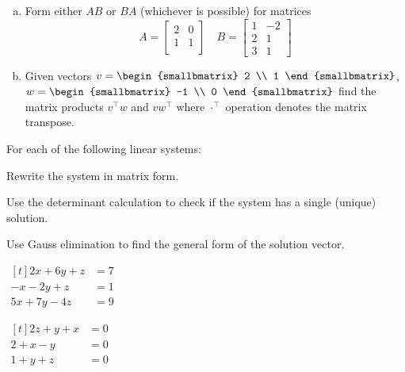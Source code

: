 \begin{question}
\begin{enumerate}[(a)]
  \item Form either \(AB\) or \(BA\) (whichever is possible) for matrices
    \begin{equation*}
      A =
      \begin{bmatrix*}
        2 & 0  \\
        1 & 1 \\
      \end{bmatrix*}
\quad
      B =
      \begin{bmatrix*}
        1 & -2 \\
        2 & 1 \\
        3 & 1
      \end{bmatrix*}
    \end{equation*}


  \item Given vectors \(v =
    \begin{smallbmatrix}
      2 \\ 1
    \end{smallbmatrix}
\), \(w =
    \begin{smallbmatrix}
      -1 \\ 0
    \end{smallbmatrix}
    \)
    find the matrix products \(v^\top w\) and \(v w^\top\) where \(\cdot^{\top}\) operation denotes the matrix transpose.

  \end{enumerate}
\end{question}

\begin{question}
 For each of the following linear systems:
\begin{compactenum}[(i)]
\item Rewrite the system in matrix form.
\item Use the determinant calculation to check if the system has a single (unique) solution. 
\item Use Gauss elimination to find the general form of the solution vector.
\end{compactenum}

\begin{colenumerate}
\item\( \begin{aligned}[t]
2x + 6y + z  &= 7\\
-x - 2y + z   &= 1\\
5x + 7y - 4z &= 9
       \end{aligned}\)
     \item\( \begin{aligned}[t]
2z + y + x  &= 0\\
2 + x - y   &= 0\\
1 + y + z   &= 0
       \end{aligned} \)
\end{colenumerate}
\end{question}

